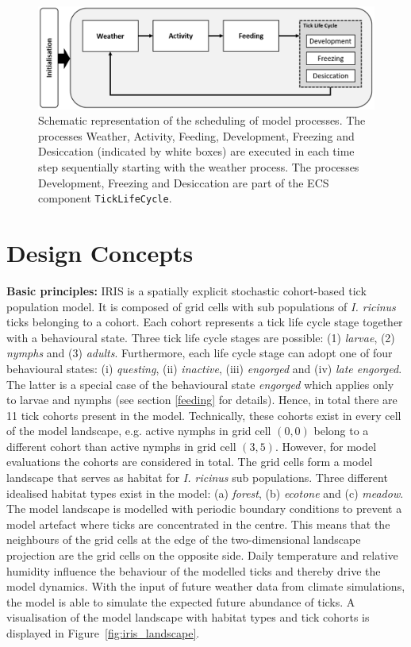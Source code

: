 \documentclass[a4paper, 11pt]{scrartcl}
\newcommand{\inlinecode}[1]{\texttt{\small #1}}
\begin{document}
\begin{figure}[h!]
\centering
\includegraphics[width=0.8\linewidth]{figures/iris_scheduling.png}
\caption[Schematic representation of the scheduling of model processes.]{Schematic representation of the scheduling of model processes. The processes Weather, Activity, Feeding, Development, Freezing and Desiccation (indicated by white boxes) are executed in each time step sequentially starting with the weather process. The processes Development, Freezing and Desiccation are part of the ECS component \inlinecode{TickLifeCycle}.}
\label{fig:iris_scheduling}
\end{figure}


\newpage
\section{Design Concepts}\label{design_concepts}
\textbf{Basic principles:} IRIS is a spatially explicit stochastic cohort-based tick population model. It is composed of grid cells with sub populations of \textit{I. ricinus} ticks belonging to a cohort. Each cohort represents a tick life cycle stage together with a behavioural state. Three tick life cycle stages are possible: (1) \emph{larvae}, (2) \emph{nymphs} and (3) \emph{adults}. Furthermore, each life cycle stage can adopt one of four behavioural states: (i) \emph{questing}, (ii) \emph{inactive}, (iii)  \emph{engorged} and (iv) \emph{late engorged}. The latter is a special case of the behavioural state \emph{engorged} which applies only to larvae and nymphs (see section \ref{feeding} for details). Hence, in total there are 11 tick cohorts present in the model. Technically, these cohorts exist in every cell of the model landscape, e.g. active nymphs in grid cell $(0,0)$ belong to a different cohort than active nymphs in grid cell $(3,5)$. However, for model evaluations the cohorts are considered in total. The grid cells form a model landscape that serves as habitat for \emph{I. ricinus} sub populations. Three different idealised habitat types exist in the model: (a) \emph{forest}, (b) \emph{ecotone} and (c) \emph{meadow}. The model landscape is modelled with periodic boundary conditions to prevent a model artefact where ticks are concentrated in the centre. This means that the neighbours of the grid cells at the edge of the two-dimensional landscape projection are the grid cells on the opposite side. Daily temperature and relative humidity influence the behaviour of the modelled ticks and thereby drive the model dynamics. With the input of future weather data from climate simulations, the model is able to simulate the expected future abundance of ticks. A visualisation of the model landscape with habitat types and tick cohorts is displayed in Figure~\ref{fig:iris_landscape}.
\end{document}
